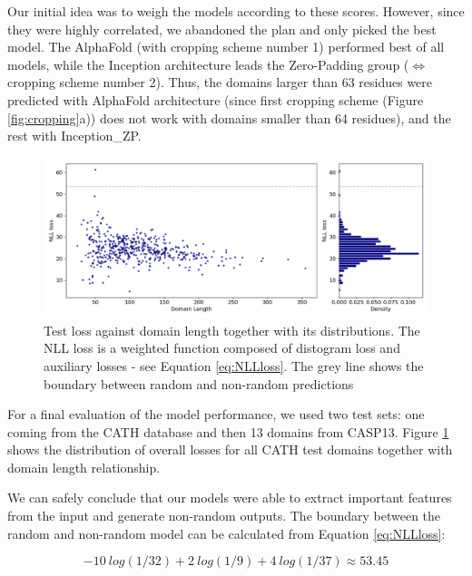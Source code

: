 Our initial idea was to weigh the models according to these scores. 
However, since they were highly correlated, we abandoned the plan and only picked the best model. 
The AlphaFold (with cropping scheme number 1) performed best of all models, while the Inception architecture leads the Zero-Padding group ($\Leftrightarrow$ cropping scheme number 2). 
Thus, the domains larger than 63 residues were predicted with AlphaFold architecture (since first cropping scheme (Figure \ref{fig:cropping}a)) does not work with domains smaller than 64 residues), and the rest with Inception\_ZP. 

\begin{figure}
    \centering
    \includegraphics[width=\linewidth]{imgs_tomas/test_losses_distributions.png}
    \caption{Test loss against domain length together with its distributions. The NLL loss is a weighted function composed of distogram loss and auxiliary losses - see Equation \ref{eq:NLLloss}. The grey line shows the boundary between random and non-random predictions}
    \label{fig:test_losses}
\end{figure}

For a final evaluation of the model performance, we used two test sets: one coming from the CATH database and then 13 domains from CASP13. Figure \ref{fig:test_losses} shows the distribution of overall losses for all CATH test domains together with domain length relationship. 

We can safely conclude that our models were able to extract important features from the input and generate non-random outputs. The boundary between the random and non-random model can be calculated from Equation \ref{eq:NLLloss}:

$$- 10~log(1/32) + 2~log(1/9) + 4~log(1 / 37) \approx 53.45$$


